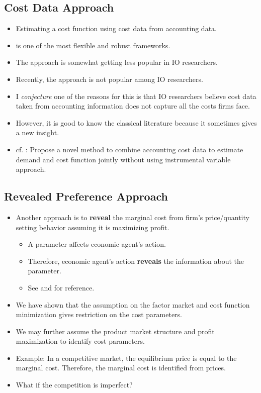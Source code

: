 \documentclass[]{book}
\providecommand{\tightlist}{%
  \setlength{\itemsep}{0pt}\setlength{\parskip}{0pt}}
\begin{document}
\subsection{Cost Data Approach}\label{cost-data-approach}

\begin{itemize}
\tightlist
\item
  Estimating a cost function using cost data from accounting data.
\item
  \citet{McElroy1987} is one of the most flexible and robust frameworks.
\item
  The approach is somewhat getting less popular in IO researchers.
\item
  Recently, the approach is not popular among IO researchers.
\item
  I \textit{conjecture} one of the reasons for this is that IO
  researchers believe cost data taken from accounting information does
  not capture all the costs firms face.
\item
  However, it is good to know the classical literature because it
  sometimes gives a new insight.
\item
  cf. \citet{Byrne2015} : Propose a novel method to combine accounting
  cost data to estimate demand and cost function jointly without using
  instrumental variable approach.
\end{itemize}

\subsection{Revealed Preference
Approach}\label{revealed-preference-approach}

\begin{itemize}
\tightlist
\item
  Another approach is to \textbf{reveal} the marginal cost from firm's
  price/quantity setting behavior assuming it is maximizing profit.

  \begin{itemize}
  \tightlist
  \item
    A parameter affects economic agent's action.
  \item
    Therefore, economic agent's action \textbf{reveals} the information
    about the parameter.
  \item
    See \citet{Bresnahan1981} and \citet{Bresnahan1989} for reference.
  \end{itemize}
\item
  We have shown that the assumption on the factor market and cost
  function minimization gives restriction on the cost parameters.
\item
  We may further assume the product market structure and profit
  maximization to identify cost parameters.
\item
  Example: In a competitive market, the equilibrium price is equal to
  the marginal cost. Therefore, the marginal cost is identified from
  prices.
\item
  What if the competition is imperfect?
\end{itemize}
\end{document}
